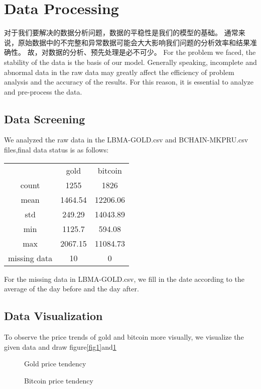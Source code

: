 \documentclass{mcmthesis}
\begin{document}
\section{Data Processing}
对于我们要解决的数据分析问题，数据的平稳性是我们的模型的基础。
通常来说，原始数据中的不完整和异常数据可能会大大影响我们问题的分析效率和结果准确性。
故，对数据的分析、预先处理是必不可少。
For the problem we faced, 
the stability of the data is the basis of our model.
Generally speaking, incomplete and abnormal data in the raw data may greatly affect the efficiency of problem analysis and the accuracy of the results.
For this reason, it is essential to analyze and pre-process the data.

\subsection{Data Screening}
We analyzed the raw data in the LBMA-GOLD.csv and BCHAIN-MKPRU.csv files,final data status is as follows:

\begin{table}[]
  \begin{tabular}{ccc}
               & gold    & bitcoin  \\
  count        & 1255    & 1826     \\
  mean         & 1464.54 & 12206.06 \\
  std          & 249.29  & 14043.89 \\
  min          & 1125.7  & 594.08   \\
  max          & 2067.15 & 11084.73 \\
  missing data & 10      & 0       
  \end{tabular}
  \end{table}
For the missing data in LBMA-GOLD.csv, we fill in the date according to the average of the day before and the day after.


\subsection{Data Visualization}
To observe the price trends of gold and bitcoin more visually,
we visualize the given data and draw figure\ref{fig1}and\ref{fig2}
\begin{figure}[h]
  \centering
  \caption{Gold price tendency} \label{fig1}
  \centering
  \caption{Bitcoin price tendency} \label{fig2}
  \end{figure}
\end{document}
